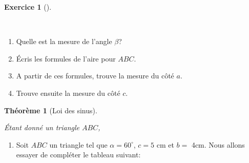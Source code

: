 \documentclass[
  a4paper,
  DIV=11,
  numbers=noendperiod,
  oneside]{scrreprt}
\providecommand{\tightlist}{%
  \setlength{\itemsep}{0pt}\setlength{\parskip}{0pt}}\usepackage{longtable,booktabs,array}
\theoremstyle{definition}
\theoremstyle{definition}
\newtheorem{exercise}{Exercice}[chapter]
\theoremstyle{plain}
\newtheorem{theorem}{Théorème}[chapter]
\theoremstyle{definition}
\theoremstyle{remark}
\begin{document}
\begin{exercise}[]\protect\hypertarget{exr-loi-sin}{}\label{exr-loi-sin}

~

\begin{enumerate}
\def\labelenumi{\arabic{enumi}.}
\tightlist
\item
  Quelle est la mesure de l'angle \(\beta\)?
\item
  Écris les formules de l'aire pour \(ABC\).
\item
  A partir de ces formules, trouve la mesure du côté \(a\).
\item
  Trouve ensuite la mesure du côté \(c\).
\end{enumerate}

\end{exercise}

\begin{theorem}[Loi des
sinus]\protect\hypertarget{thm-aire}{}\label{thm-aire}

Étant donné un triangle \(ABC\), \vspace{2cm}

\end{theorem}

\begin{enumerate}
\def\labelenumi{\arabic{enumi})}
\setcounter{enumi}{1}
\tightlist
\item
  Soit \(ABC\) un triangle tel que \(\alpha=60^\circ\), \(c=5\) cm et
  \(b=\) 4cm. Nous allons essayer de compléter le tableau suivant:
\end{enumerate}
\end{document}
